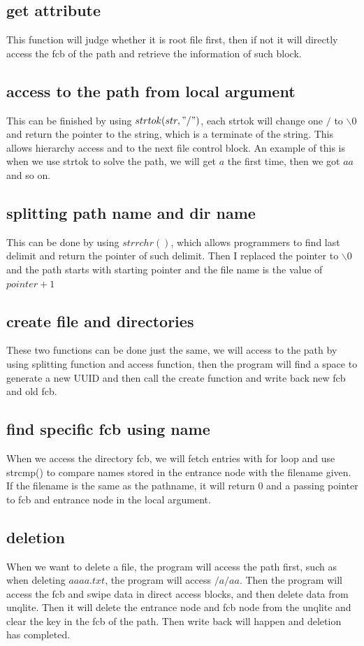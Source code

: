 \documentclass[legalpaper]{article}
\begin{document}
	\subsection*{get attribute}
	This function will judge whether it is root file first, then if not it will directly access the fcb of the path and retrieve the information of such block. 
	\subsection*{access to the path from local argument}
	This can be finished by using $strtok(str, "/")$, each strtok will change one $/$ to $\backslash 0$ and return the pointer to the string, which is a terminate of the string. This allows hierarchy access and to the next file control block. An example of this is when we use strtok to solve the path, we will get $a$ the first time, then we got $aa$ and so on.
	\subsection*{splitting path name and dir name}
	This can be done by using $strrchr()$, which allows programmers to find last delimit and return the pointer of such delimit. Then I replaced the pointer to $\backslash 0$ and the path starts with starting pointer and the file name is the value of $pointer + 1$
	\subsection*{create file and directories}
	These two functions can be done just the same, we will access to the path by using splitting function and access function, then the program will find a space to generate a new UUID and then call the create function and write back new fcb and old fcb.
	\subsection*{find specific fcb using name}
	When we access the directory fcb, we will fetch entries with for loop and use strcmp() to compare names stored in the entrance node with the filename given. If the filename is the same as the pathname, it will return 0 and a passing pointer to fcb and entrance node in the local argument.	
	\subsection*{deletion}
	When we want to delete a file, the program will access the path first, such as when deleting $aaaa.txt$, the program will access $/a/aa$. Then the program will access the fcb and swipe data in direct access blocks, and then delete data from unqlite. Then it will delete the entrance node and fcb node from the unqlite and clear the key in the fcb of the path. Then write back will happen and deletion has completed.
\end{document}
